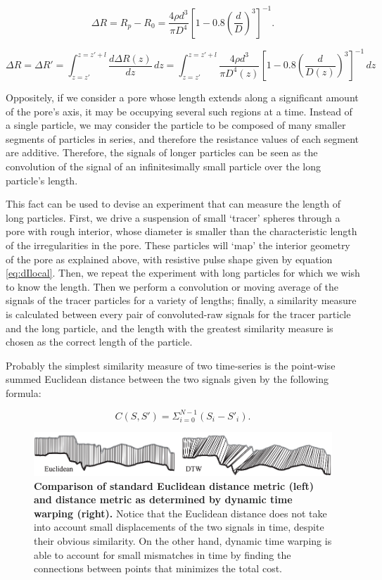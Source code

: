 		\begin{equation}\label{eq:dIlocal}
			\Delta R=R_{p}-R_{0}=\frac{4\rho d^{3}}{\pi D^{4}}\left[1-0.8\left(\frac{d}{D}\right)^{3}\right]^{-1}.
		\end{equation}

		
		\begin{equation}\label{eq:theoreticalmovingaverage}
			\Delta R=\Delta R'=\int_{z=z'}^{z=z'+l}\frac{d\Delta R\left(z\right)}{dz}\,dz=\int_{z=z'}^{z=z'+l}\frac{4\rho d^{3}}{\pi D^{4}\left(z\right)}\left[1-0.8\left(\frac{d}{D\left(z\right)}\right)^{3}\right]^{-1}\,dz
		\end{equation}

		
		Oppositely, if we consider a pore whose length extends along a significant amount of the pore's axis, it may be occupying several such regions at a time. Instead of a single particle, we may consider the particle to be composed of many smaller segments of particles in series, and therefore the resistance values of each segment are additive. Therefore, the signals of longer particles can be seen as the convolution of the signal of an infinitesimally small particle over the long particle's length. 
		
		This fact can be used to devise an experiment that can measure the length of long particles. First, we drive a suspension of small `tracer' spheres through a pore with rough interior, whose diameter is smaller than the characteristic length of the irregularities in the pore. These particles will `map' the interior geometry of the pore as explained above, with resistive pulse shape given by equation \ref{eq:dIlocal}. Then, we repeat the experiment with long particles for which we wish to know the length. Then we perform a convolution or moving average of the signals of the tracer particles for a variety of lengths; finally, a similarity measure is calculated between every pair of convoluted-raw signals for the tracer particle and the long particle, and the length with the greatest similarity measure is chosen as the correct length of the particle.
		
		Probably the simplest similarity measure of two time-series is the point-wise summed Euclidean distance between the two signals given by the following formula:
		
		$$ C\left(S, S'\right)=\Sigma_{i=0}^{N-1}\left(S_{i}-S'_{i}\right). $$
		
		\begin{figure}
			\includegraphics[width=\textwidth]{eucliddtw}
			\caption{\textbf{Comparison of standard Euclidean distance metric (left) and distance metric as determined by dynamic time warping (right).} Notice that the Euclidean distance does not take into account small displacements of the two signals in time, despite their obvious similarity. On the other hand, dynamic time warping is able to account for small mismatches in time by finding the connections between points that minimizes the total cost.}
			\label{fig:eucliddtw}
		\end{figure}

